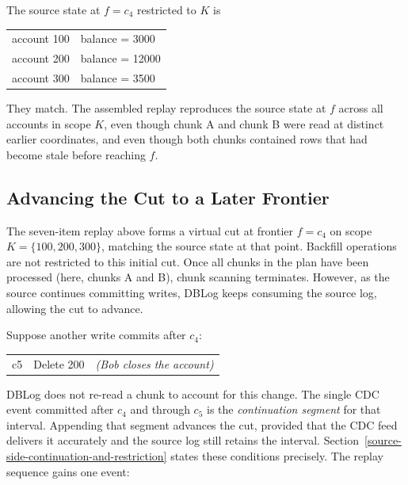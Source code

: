\documentclass[letterpaper,10pt,twocolumn]{article}
\begin{document}
The source state at $f = c_4$ restricted to $K$ is

\begin{center}\ttfamily\footnotesize
\begin{tabular}{@{}l@{\hskip 1em}l@{}}
account 100 & balance = \phantom{0}3000\\
account 200 & balance = 12000\\
account 300 & balance = \phantom{0}3500\\
\end{tabular}
\end{center}

They match. The assembled replay reproduces the source state at $f$
across all accounts in scope $K$, even though chunk A and chunk B were read
at distinct earlier coordinates, and even though both chunks contained rows
that had become stale before reaching $f$.

\subsection{Advancing the Cut to a Later
Frontier}\label{sec:advancing-cut-running-example}

The seven-item replay above forms a virtual cut at frontier $f = c_4$
on scope $K = \{100, 200, 300\}$, matching the source state at that
point. Backfill operations are not restricted to this initial cut.
Once all chunks in the plan have been processed (here, chunks A and B),
chunk scanning terminates.
However, as the source continues committing writes, DBLog keeps consuming
the source log, allowing the cut to advance.

Suppose another write commits after $c_4$:

\begin{center}\footnotesize
\begin{tabular}{@{}l@{\hskip 1em}l@{\hskip 1em}l@{}}
\ttfamily c5 & \ttfamily Delete 200 & \itshape (Bob closes the account)\\
\end{tabular}
\end{center}

DBLog does not re-read a chunk to account for this change. The single
CDC event committed after $c_4$ and through $c_5$ is the
\emph{continuation segment} for that interval. Appending that segment
advances the cut, provided that the CDC feed delivers it accurately and
the source log still retains the interval. Section~\ref{source-side-continuation-and-restriction}
states these conditions precisely.
The replay sequence gains one event:
\end{document}
